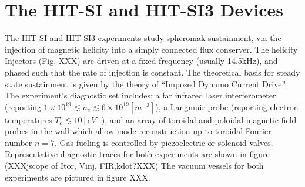\documentclass{AIAA}
\begin{document}
\section{The HIT-SI and HIT-SI3 Devices}
\hspace{4ex}The HIT-SI\cite{sieck2005initial} and HIT-SI3\cite{Hossack_HitSi3} experiments study spheromak sustainment, via the injection of magnetic helicity into a simply connected flux conserver. The helicity Injectors (Fig. XXX) are driven at a fixed frequency (usually 14.5kHz), and phased such that the rate of injection is constant. The theoretical basis for steady state sustainment is given by the theory of ``Imposed Dynamo Current Drive''\cite{jarboe2012imposed}. The experiment's diagnostic set includes: a far infrared laser interferometer (reporting $1\times10^{19}\lesssim{n_e}\lesssim6\times10^{19}[m^{-3}]$)\cite{hossack2013reduction}, a Langmuir probe (reporting electron temperatures $T_e\lesssim10[eV]$)\cite{ONeil2007experimental}, and an array of toroidal and poloidal magnetic field probes in the wall which allow mode reconstruction up to toroidal Fourier number $n=7$\cite{Oneil2007overview}. Gas fueling is controlled by piezoelectric\cite{hossack2015study} or solenoid valves. Representative diagnostic traces for both experiments are shown in figure (XXXjscope of Itor, Vinj, FIR,kdot?XXX) The vacuum vessels for both experiments are pictured in figure XXX.


\end{document}
